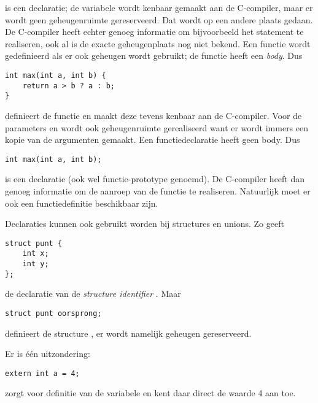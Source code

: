 is een declaratie; de variabele wordt kenbaar gemaakt aan de C-compiler, maar er wordt geen geheugenruimte gereserveerd. Dat wordt op een andere plaats gedaan. De C-compiler heeft echter genoeg informatie om bijvoorbeeld het statement  te realiseren, ook al is de exacte geheugenplaats nog niet bekend. Een functie wordt gedefinieerd als er ook geheugen wordt gebruikt; de functie heeft een \textsl{body}. Dus

\begin{lstlisting}[style=lstoneline]
int max(int a, int b) {
    return a > b ? a : b;
}
\end{lstlisting}

definieert de functie  en maakt deze tevens kenbaar aan de C-compiler. Voor de parameters  en  wordt ook geheugenruimte gerealiseerd want er wordt immers een kopie van de argumenten gemaakt. Een functiedeclaratie heeft geen body. Dus

\begin{lstlisting}[style=lstoneline]
int max(int a, int b);
\end{lstlisting}

is een declaratie (ook wel functie-prototype genoemd). De C-compiler heeft dan genoeg informatie om de aanroep van de functie te realiseren. Natuurlijk moet er ook een functiedefinitie beschikbaar zijn.

Declaraties kunnen ook gebruikt worden bij structures en unions. Zo geeft

\begin{lstlisting}[style=lstoneline]
struct punt {
    int x;
    int y;
};
\end{lstlisting}

de declaratie van de \textsl{structure identifier} . Maar

\begin{lstlisting}[style=lstoneline]
struct punt oorsprong;
\end{lstlisting}

definieert de structure , er wordt namelijk geheugen gereserveerd.

Er is één uitzondering:

\begin{lstlisting}[style=lstoneline]
extern int a = 4;
\end{lstlisting}

zorgt voor definitie van de variabele  en kent daar direct de waarde 4 aan toe.


